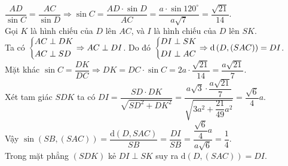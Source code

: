 \begin{ex}
{{
        }
        $\dfrac{AD}{\sin C}=\dfrac{AC}{\sin D}\Rightarrow\sin C=\dfrac{AD\cdot\sin D}{AC} =\dfrac{a\cdot\sin 120^{\circ}}{a\sqrt{7}}=\dfrac{\sqrt{21}}{14}$.\\
        Gọi $K$ là hình chiếu của $D$ lên $AC$, và $I$ là hình chiếu của $D$ lên $SK$.\\
        Ta có $\left\{\begin{aligned}&AC\perp DK\\&AC\perp SD\end{aligned}\right.\Rightarrow AC\perp DI$. Do đó $\left\{\begin{aligned}&DI\perp SK\\&DI\perp AC\end{aligned}\right.\Rightarrow\mathrm{d}\left(D,(SAC)\right)=DI$.\\
        Mặt khác $\sin C=\dfrac{DK}{DC}\Rightarrow DK=DC\cdot \sin C =2a\cdot\dfrac{\sqrt{21}}{14} =\dfrac{a\sqrt{21}}{7}$.\\
        Xét tam giác $SDK$ ta có $DI=\dfrac{SD\cdot DK}{\sqrt{SD^2+DK^2}} =\dfrac{a\sqrt{3}\cdot\dfrac{a\sqrt{21}}{7}}{\sqrt{3a^2+\dfrac{21}{49}a^2}} =\dfrac{\sqrt{6}}{4}a$.\\
        Vậy $\sin\left(SB,(SAC)\right)=\dfrac{\mathrm{d}(D, SAC)}{SB} =\dfrac{DI}{SB} =\dfrac{\dfrac{\sqrt{6}}{4}a}{a\sqrt{6}}=\dfrac{1}{4}$.\\
        Trong mặt phẳng $(SDK)$ kẻ $DI\perp SK$ suy ra $\mathrm{d}\left(D,(SAC)\right)=DI$.
    }
\end{ex}

